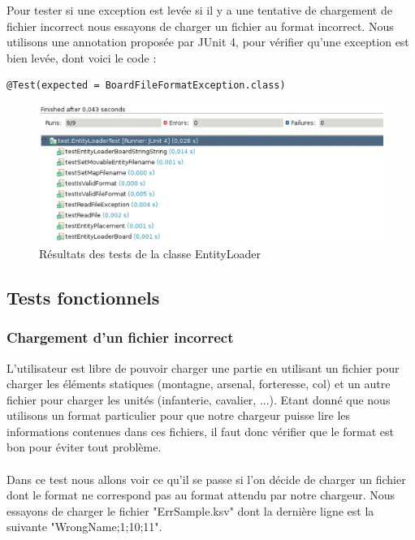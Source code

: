 				Pour tester si une exception est levée si il y a une tentative de chargement de fichier incorrect nous essayons de charger un fichier au format incorrect.
				Nous utilisons une annotation proposée par JUnit 4, pour vérifier qu'une exception est bien levée, dont voici le code : 
				
				\begin{lstlisting}[frame=single]
@Test(expected = BoardFileFormatException.class)
				\end{lstlisting}

				\begin{figure}[!h]
				    \caption{Résultats des tests de la classe EntityLoader}
				    \centering
				    \includegraphics[scale=0.7]{images/tests_unitaires/entityloader.ps}
				\end{figure}

				
				
		
		\subsection{Tests fonctionnels}
		
			\subsubsection{Chargement d'un fichier incorrect}
				L'utilisateur est libre de pouvoir charger une partie en utilisant un fichier pour charger les éléments statiques (montagne, arsenal, forteresse, col) et un autre fichier pour charger les unités (infanterie, cavalier, ...). Etant donné que nous utilisons un format particulier pour que notre chargeur puisse lire les informations contenues dans ces fichiers, il faut donc vérifier que le format est bon pour éviter tout problème.
				\\ \\
				Dans ce test nous allons voir ce qu'il se passe si l'on décide de charger un fichier dont le format ne correspond pas au format attendu par notre chargeur.
				Nous essayons de charger le fichier "ErrSample.ksv" dont la dernière ligne est la suivante "WrongName;1;10;11". 

